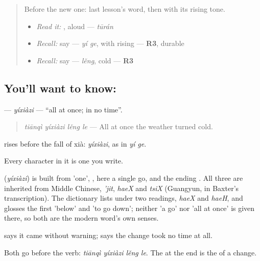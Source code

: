 \label{lesson:ZH-C279-yixiazi}



\begin{quote}
Before the new one: last lesson's word, then  with its rising tone.

\begin{itemize}
\raggedright
  \item \emph{Read it:} , aloud — \emph{tūrán}
  \item \emph{Recall:} say  — \emph{yí ge}, with  rising — \textbf{R3}, durable
  \item \emph{Recall:} say  — \emph{lěng}, cold — \textbf{R3}
\end{itemize}
\end{quote}

\subsection*{You'll want to know: }
\textbf{} — \emph{yíxiàzi} — \textquotedblleft{}all at once; in no time\textquotedblright{}.

\begin{quote}
\textbf{} \emph{tiānqì yíxiàzi lěng le} — All at once the weather turned cold.
\end{quote}

 rises before the fall of xià: \emph{yíxiàzi}, as in \emph{yí ge}.

Every character in it is one you write.

\begin{cousinweb}
\textbf{} (\emph{yíxiàzi}) is built from  'one', , here a single go, and the ending . All three are inherited from Middle Chinese, \emph{'jit}, \emph{haeX} and \emph{tsiX} (Guangyun, in Baxter's transcription). The dictionary lists  under two readings, \emph{haeX} and \emph{haeH}, and glosses the first 'below' and 'to go down'; neither 'a go' nor 'all at once' is given there, so both are the modern word's own senses.
\end{cousinweb}

\begin{grammarlens}[title={What you've built}]
 says it came without warning;  says the change took no time at all.

Both go before the verb: \textbf{} \emph{tiānqì yíxiàzi lěng le}. The  at the end is the  of a change.
\end{grammarlens}

